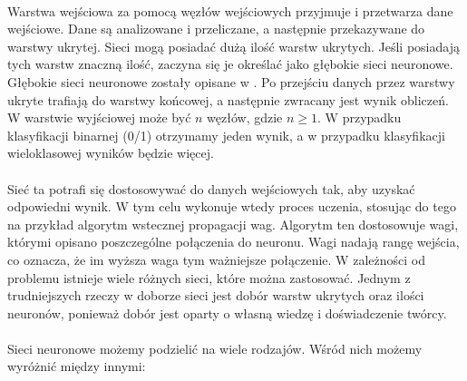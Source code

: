 \ \\
Warstwa wejściowa za pomocą węzłów wejściowych przyjmuje i przetwarza dane wejściowe. Dane są analizowane i przeliczane, a następnie przekazywane do warstwy ukrytej. Sieci mogą posiadać dużą ilość warstw ukrytych. Jeśli posiadają tych warstw znaczną ilość, zaczyna się je określać jako głębokie sieci neuronowe. Głębokie sieci neuronowe zostały opisane w . Po przejściu danych przez warstwy ukryte trafiają do warstwy końcowej, a następnie zwracany jest wynik obliczeń. W warstwie wyjściowej może być $n$ węzłów, gdzie $n \geq 1$. W przypadku klasyfikacji binarnej (0/1) otrzymamy jeden wynik, a w przypadku klasyfikacji wieloklasowej wyników będzie więcej.
\\ \\
Sieć ta potrafi się dostosowywać do danych wejściowych tak, aby uzyskać odpowiedni wynik. W tym celu wykonuje wtedy proces uczenia, stosując do tego na przykład algorytm wstecznej propagacji wag. Algorytm ten dostosowuje wagi, którymi opisano poszczególne połączenia do neuronu. Wagi nadają rangę wejścia, co oznacza, że im wyższa waga tym ważniejsze połączenie. W zależności od problemu istnieje wiele różnych sieci, które można zastosować. Jednym z trudniejszych rzeczy w doborze sieci jest dobór warstw ukrytych oraz ilości neuronów, ponieważ dobór jest oparty o własną wiedzę i doświadczenie twórcy.
\\ \\
Sieci neuronowe możemy podzielić na wiele rodzajów. Wśród nich możemy wyróżnić między innymi:
